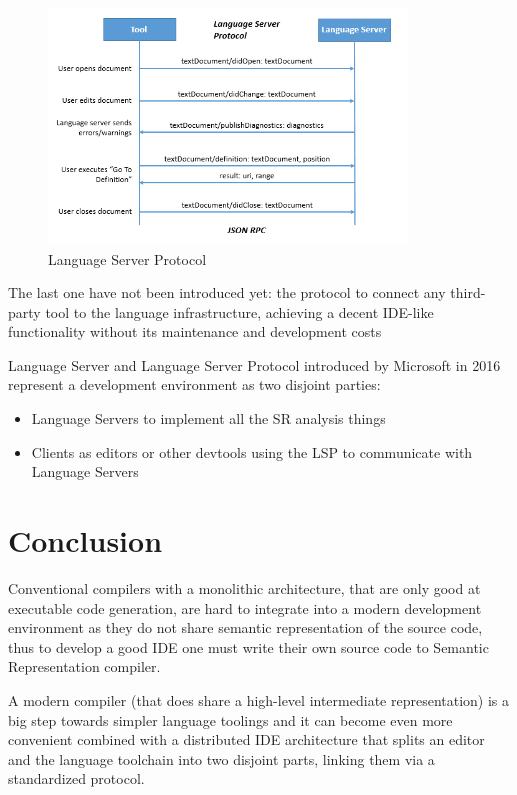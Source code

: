\begin{figure}[H]
    \centering
    \includegraphics[width=0.85\textwidth]{figs/lsp.png}
    \caption{Language Server Protocol}
\end{figure}

The last one have not been introduced yet: the protocol to connect any
third-party tool to the language infrastructure, achieving a decent IDE-like
functionality without its maintenance and development costs
   
Language Server and Language Server Protocol introduced by Microsoft in 2016
represent a development environment as two disjoint parties:
\begin{itemize}
    \item Language Servers to implement all the SR analysis things
    \item Clients as editors or other devtools using the LSP to communicate with Language Servers \cite{Sourcegraph}
\end{itemize}

\section{Conclusion}
\label{sec:review_conclusion}

Conventional compilers with a monolithic architecture, that are only good at executable code generation,
are hard to integrate into a modern development environment as they do not share 
semantic representation of the source code, thus to develop a good IDE one must write their own 
source code to Semantic Representation compiler.

A modern compiler (that does share a high-level intermediate representation) is
a big step towards simpler language toolings and it can become even more convenient
combined with a distributed IDE architecture that splits an editor and the language toolchain
into two disjoint parts, linking them via a standardized protocol.

